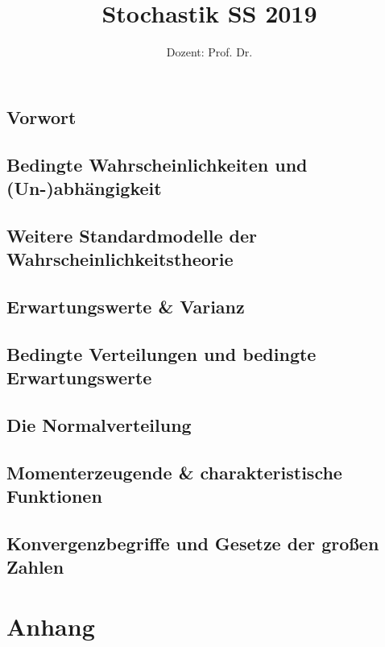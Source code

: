 \documentclass[ngerman,a4paper,order=firstname]{local_mathscript} %
\title{\textbf{Stochastik SS 2019}}
\author{Dozent: Prof. Dr. \person{Anita Behme}}
\begin{document}
\pagestyle{plain}

\maketitle

\hypertarget{tocpage}{}
\tableofcontents
{}

\pagebreak
{}
\pagestyle{fancy}

\chapter*{Vorwort}





\chapter[Bedingte Wkeiten und (Un-)abbhängigkeit]{Bedingte Wahrscheinlichkeiten und (Un-)ab\-hängigkeit}


\chapter{Weitere Standardmodelle der Wahrscheinlichkeitstheorie}


\chapter{Erwartungswerte \& Varianz}



\chapter{Bedingte Verteilungen und bedingte Erwartungswerte}


\chapter{Die Normalverteilung}

\chapter{Momenterzeugende \& charakteristische Funktionen}

\chapter{Konvergenzbegriffe und Gesetze der großen Zahlen}


\part*{Anhang}
\appendix

\nocite{*}




\printindex
\end{document}
